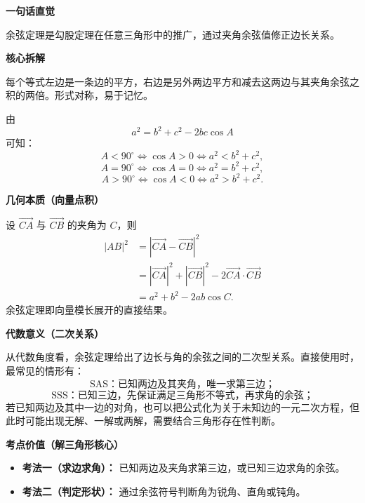 \begin{explanationbox}
	\textbf{\textcolor{CExplanation}{一句话直觉}}

	余弦定理是勾股定理在任意三角形中的推广，通过夹角余弦值修正边长关系。

	\medskip
	\textbf{\textcolor{CExplanation}{核心拆解}}
	\begin{description}[style=nextline, leftmargin=2.8em, labelsep=0.5em, itemsep=0.45em]
		\item[\textbf{要点一（结构对称）：}] 每个等式左边是一条边的平方，右边是另外两边平方和减去这两边与其夹角余弦之积的两倍。形式对称，易于记忆。

		\item[\textbf{要点二（符号影响）：}] 由
		      \[
			      a^2=b^2+c^2-2bc\cos A
		      \]
		      可知：
		      \[
			      A<90^\circ \Longleftrightarrow \cos A>0 \Longleftrightarrow a^2<b^2+c^2,
		      \]
		      \[
			      A=90^\circ \Longleftrightarrow \cos A=0 \Longleftrightarrow a^2=b^2+c^2,
		      \]
		      \[
			      A>90^\circ \Longleftrightarrow \cos A<0 \Longleftrightarrow a^2>b^2+c^2.
		      \]
	\end{description}

	\medskip
	\textbf{\textcolor{CExplanation}{几何本质（向量点积）}}

	设 $\overrightarrow{CA}$ 与 $\overrightarrow{CB}$ 的夹角为 $C$，则
	\[
		\begin{aligned}
			|AB|^2 & = |\overrightarrow{CA} - \overrightarrow{CB}|^2                                                      \\
			       & = |\overrightarrow{CA}|^2 + |\overrightarrow{CB}|^2 - 2\overrightarrow{CA} \cdot \overrightarrow{CB} \\
			       & = a^2 + b^2 - 2ab\cos C.
		\end{aligned}
	\]
	余弦定理即向量模长展开的直接结果。

	\medskip
	\textbf{\textcolor{CExplanation}{代数意义（二次关系）}}

	从代数角度看，余弦定理给出了边长与角的余弦之间的二次型关系。直接使用时，最常见的情形有：
	\[
		\text{SAS：已知两边及其夹角，唯一求第三边；}
	\]
	\[
		\text{SSS：已知三边，先保证满足三角形不等式，再求角的余弦；}
	\]
	若已知两边及其中一边的对角，也可以把公式化为关于未知边的一元二次方程，但此时可能出现无解、一解或两解，需要结合三角形存在性判断。

	\medskip
	\textbf{\textcolor{CExplanation}{考点价值（解三角形核心）}}
	\begin{itemize}[leftmargin=*, itemsep=0.5em, topsep=0.4em]
		\item \textbf{考法一（求边求角）：} 已知两边及夹角求第三边，或已知三边求角的余弦。
		\item \textbf{考法二（判定形状）：} 通过余弦符号判断角为锐角、直角或钝角。
	\end{itemize}


\end{explanationbox}

